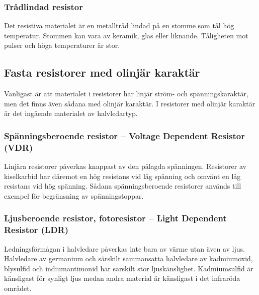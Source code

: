 \subsubsection{Trådlindad resistor}

Det resistiva materialet är en metalltråd lindad på en stomme som tål hög
temperatur.
Stommen kan vara av keramik, glas eller liknande.
Tåligheten mot pulser och höga temperaturer är stor.

\subsection{Fasta resistorer med olinjär karaktär}
\label{fasta_resistorer_olinjära}

Vanligast är att materialet i resistorer har linjär ström- och
spänningskaraktär, men det finns även sådana med olinjär karaktär.
I resistorer med olinjär karaktär är det ingående materialet av halvledartyp.

\subsubsection{Spänningsberoende resistor -- Voltage Dependent Resistor (VDR)}

Linjära resistorer påverkas knappast av den pålagda spänningen.
Resistorer av kiselkarbid har däremot en hög resistans vid låg spänning och
omvänt en låg resistans vid hög spänning.
Sådana spänningsberoende resistorer används till exempel för begränsning av
spänningstoppar.

\subsubsection{Ljusberoende resistor, fotoresistor -- Light Dependent Resistor (LDR)}

Ledningsförmågan i halvledare påverkas inte bara av värme utan även av ljus.
Halvledare av germanium och särskilt sammansatta halvledare av kadmiumoxid,
blysulfid och indiumantimonid har särskilt stor ljuskänslighet. Kadmiumsulfid
är känsligast för synligt ljus medan andra material är känsligast i det
infraröda området.

